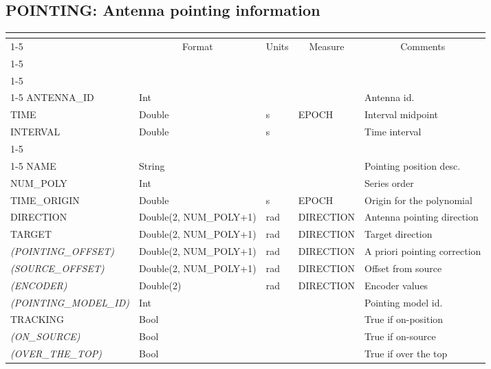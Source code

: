 \documentclass{article}
\newcommand{\defline}[1]{\cline{1-5}
\multicolumn{5}{|l|}{#1} \\
\cline{1-5}}
\newcommand{\definetable}[3][]
{
  \vfill\newpage
  \subsection{#2}
  \label{tbl:#1}
  \vspace{0.15in}
  \small
  \begin{tabular}{|l|p{1.25in}|l|p{.9in}|p{1.4in}|}
  \hline
  \multicolumn{5}{|c|}{\bf #1}\\
  \cline{1-5}
  \multicolumn{1}{|c|}{Name}&\multicolumn{1}{|c|}{Format}&
  \multicolumn{1}{|c|}{Units}&\multicolumn{1}{|c|}{Measure}&
  \multicolumn{1}{|c|}{Comments}\\
  \cline{1-5}
  #3
  \hline
  \end{tabular}
}
\begin{document}
\definetable{POINTING: Antenna pointing information}{
\defline{\bf Columns}
\defline{\em Key}
ANTENNA\_ID  &  Int & & & Antenna id.\\
TIME         &  Double & s & EPOCH & Interval midpoint\\
INTERVAL     &  Double & s &       & Time interval\\
\defline{\em Data}
NAME     &   String & & & Pointing position desc.\\
NUM\_POLY & Int & & & Series order \\
TIME\_ORIGIN & Double & s & EPOCH & Origin for the polynomial\\
DIRECTION & Double(2, NUM\_POLY+1) & rad & DIRECTION &
  Antenna pointing direction\\
TARGET & Double(2, NUM\_POLY+1) & rad & DIRECTION & Target direction \\
{\it (POINTING\_OFFSET)} & Double(2, NUM\_POLY+1) & rad & DIRECTION &
  A priori pointing correction \\
{\it (SOURCE\_OFFSET)} & Double(2, NUM\_POLY+1) & rad & DIRECTION & Offset from source\\
{\it (ENCODER)} & Double(2) & rad & DIRECTION & Encoder values\\
{\it (POINTING\_MODEL\_ID)} & Int & & & Pointing model id. \\
TRACKING & Bool & & & True if on-position \\
{\it(ON\_SOURCE)} & Bool & & & True if on-source\\
{\it(OVER\_THE\_TOP)} & Bool & & & True if over the top\\
}
\end{document}
